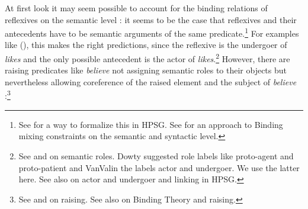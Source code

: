 \documentclass[output=paper
 	        ,biblatex
                ,babelshorthands
                ,newtxmath
                ,draftmode
                ,colorlinks, citecolor=brown
]{langscibook}
\begin{document}
At first look it may seem possible to account for the binding relations of reflexives on the
semantic level \citep{BP80a}: it seems to be the case that reflexives and their antecedents have to be semantic
arguments of the same predicate.\footnote{%
  See \citet{Riezler95a} for a way to formalize this in HPSG. See  for an approach to
  Binding mixing constraints on the semantic and syntactic level.%
} For examples like (), this makes the right predictions,
since the reflexive is the undergoer of \emph{likes} and the only possible antecedent is the actor of
\emph{likes}.\footnote{
  See  and  on semantic roles. Dowty suggested role labels like
  proto-agent and proto-patient and VanValin the labels actor and undergoer. We use the latter
  here. See also  on
  actor and undergoer and linking in HPSG.
} However, there are raising predicates like \emph{believe} not assigning semantic roles
to their objects but nevertheless allowing coreference of the raised element and the subject of
\emph{believe} \citep[]{MS98a}:\footnote{%
 See  and  on raising. See also  on Binding
 Theory and raising.%
}
\end{document}

